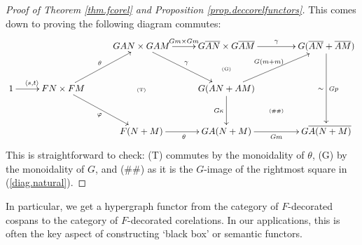\begin{proof}[Proof of Theorem \ref{thm.fcorel} and Proposition
  \ref{prop.deccorelfunctors}]
  This comes down to proving the following diagram commutes:
  \[
    \xymatrixrowsep{.8pc}
    \xymatrixcolsep{.8pc}
    \xymatrix{
      &&&& 
      GAN \times GAM \ar[rrdd]^{\gamma} \ar[rr]^{Gm \times Gm} && 
      G\overline{AN} \times G\overline{AM} \ar[rr]^{\gamma} && 
      G(\overline{AN}+\overline{AM}) \ar[dddd]^{Gp}_\sim \\ 
      &&&&&& 
      \textrm{\tiny(G)} \\
      1 \ar[rr]^(.4){\langle s,t \rangle} && 
      FN\times FM \ar[uurr]^{\theta} \ar[ddrr]_{\varphi} && 
      \textrm{\tiny(T)} && 
      G(AN+AM) \ar[uurr]^{G(m+m)} \ar[dd]_{G\kappa} \\
      &&&&&&& 
      \textrm{\tiny(\#\#)}\\ 
      &&&& 
      F(N+M) \ar[rr]_{\theta} && 
      GA(N+M) \ar[rr]_{Gm} && 
      G\overline{A(N+M)}
    }
  \]
  This is straightforward to check: (T) commutes by the monoidality of $\theta$,
  (G) by the monoidality of $G$, and (\#\#) as it is the $G$-image of the
  rightmost square in (\ref{diag.natural}).
\end{proof}

In particular, we get a hypergraph functor from the category of $F$-decorated
cospans to the category of $F$-decorated corelations. In our applications, this
is often the key aspect of constructing `black box' or semantic functors.

  


